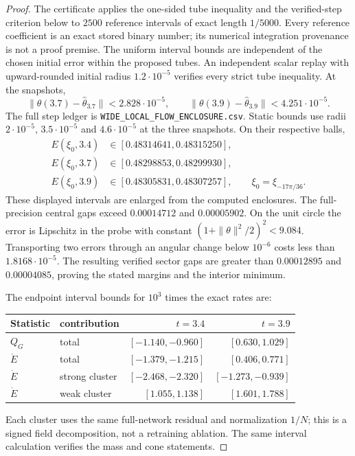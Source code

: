 \documentclass[10pt]{article}
\begin{document}
\begin{proof}
The certificate applies the one-sided tube inequality and the verified-step
criterion below to $2500$ reference intervals of exact length $1/5000$.
Every reference coefficient is an exact stored binary number; its numerical
integration provenance is not a proof premise. The uniform interval bounds
are independent of the chosen initial error within the proposed tubes.
An independent scalar replay with upward-rounded initial radius
$1.2\cdot10^{-5}$ verifies every strict tube inequality. At the snapshots,
\[
 \|\theta(3.7)-\widehat\theta_{3.7}\|<2.828\cdot10^{-5},\qquad
 \|\theta(3.9)-\widehat\theta_{3.9}\|<4.251\cdot10^{-5}.
\]
The full step ledger is \texttt{WIDE\_LOCAL\_FLOW\_ENCLOSURE.csv}.
Static bounds use radii $2\cdot10^{-5}$, $3.5\cdot10^{-5}$ and
$4.6\cdot10^{-5}$ at the three snapshots. On their respective balls,
\begin{align*}
 E(\xi_0,3.4)&\in[0.48314641,0.48315250],\\
 E(\xi_0,3.7)&\in[0.48298853,0.48299930],\\
 E(\xi_0,3.9)&\in[0.48305831,0.48307257],
 \qquad \xi_0=\xi_{-17\pi/36}.
\end{align*}
These displayed intervals are enlarged from the computed enclosures.
The full-precision central gaps exceed $0.00014712$ and $0.00005902$.
On the unit circle the error is Lipschitz in the probe with constant
$(1+\|\theta\|^2/2)^2<9.084$. Transporting two errors through an angular
change below $10^{-6}$ costs less than $1.8168\cdot10^{-5}$.
The resulting verified sector gaps are greater than $0.00012895$ and
$0.00004085$, proving the stated margins and the interior minimum.

The endpoint interval bounds for $10^3$ times the exact rates are:
\begin{center}
\begin{tabular}{llrr}
\toprule
Statistic & contribution & $t=3.4$ & $t=3.9$\\
\midrule
$Q_G$ & total & $[-1.140,-0.960]$ & $[0.630,1.029]$\\
$\dot E$ & total & $[-1.379,-1.215]$ & $[0.406,0.771]$\\
$\dot E$ & strong cluster & $[-2.468,-2.320]$ & $[-1.273,-0.939]$\\
$\dot E$ & weak cluster & $[1.055,1.138]$ & $[1.601,1.788]$\\
\bottomrule
\end{tabular}
\end{center}
Each cluster uses the same full-network residual and normalization $1/N$;
this is a signed field decomposition, not a retraining ablation.
The same interval calculation verifies the mass and cone statements.


\end{proof}
\end{document}
